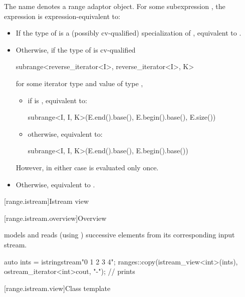 \pnum
The name  denotes a
range adaptor object.
For some subexpression , the expression
 is expression-equivalent to:
\begin{itemize}
\item
  If the type of  is
  a (possibly cv-qualified) specialization of ,
  equivalent to .
\item
  Otherwise, if the type of  is cv-qualified
\begin{codeblock}
subrange<reverse_iterator<I>, reverse_iterator<I>, K>
\end{codeblock}
  for some iterator type  and
  value  of type ,
  \begin{itemize}
  \item
    if  is , equivalent to:
\begin{codeblock}
subrange<I, I, K>(E.end().base(), E.begin().base(), E.size())
\end{codeblock}
  \item
    otherwise, equivalent to:
\begin{codeblock}
subrange<I, I, K>(E.end().base(), E.begin().base())
\end{codeblock}
  \end{itemize}
  However, in either case  is evaluated only once.
\item
  Otherwise, equivalent to .
\end{itemize}

[range.istream]{Istream view}

[range.istream.overview]{Overview}

\pnum
{} models  and
reads (using ) successive elements
from its corresponding input stream.

\pnum
\begin{example}
\begin{codeblock}
auto ints = istringstream{"0 1  2   3     4"};
ranges::copy(istream_view<int>(ints), ostream_iterator<int>{cout, "-"});
// prints 
\end{codeblock}
\end{example}

[range.istream.view]{Class template }

